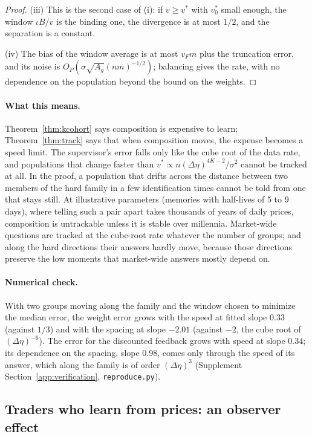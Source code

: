 \documentclass[12pt]{article}
\theoremstyle{definition}
\theoremstyle{remark}
\begin{document}
\begin{proof}
(iii) This is the second case of (i): if $v\ge v^*$ with $v^*_0$ small enough, the window $\iota B/v$ is the binding one, the divergence is at most $1/2$, and the separation is a constant.

(iv) The bias of the window average is at most $v_Fm$ plus the truncation error, and its noise is $O_P(\sigma\sqrt{A_g}(nm)^{-1/2})$; balancing gives the rate, with no dependence on the population beyond the bound on the weights.
\end{proof}

\paragraph{What this means.} Theorem~\ref{thm:kcohort} says composition is expensive to learn; Theorem~\ref{thm:track} says that when composition moves, the expense becomes a speed limit. The supervisor's error falls only like the cube root of the data rate, and populations that change faster than $v^*\propto n(\Delta\eta)^{4K-2}/\sigma^2$ cannot be tracked at all. In the proof, a population that drifts across the distance between two members of the hard family in a few identification times cannot be told from one that stays still. At illustrative parameters (memories with half-lives of 5 to 9 days), where telling such a pair apart takes thousands of years of daily prices, composition is untrackable unless it is stable over millennia. Market-wide questions are tracked at the cube-root rate whatever the number of groups; and along the hard directions their answers hardly move, because those directions preserve the low moments that market-wide answers mostly depend on.

\paragraph{Numerical check.} With two groups moving along the family and the window chosen to minimize the median error, the weight error grows with the speed at fitted slope $0.33$ (against $1/3$) and with the spacing at slope $-2.01$ (against $-2$, the cube root of $(\Delta\eta)^{-6}$). The error for the discounted feedback grows with speed at slope $0.34$; its dependence on the spacing, slope $0.98$, comes only through the speed of its answer, which along the family is of order $(\Delta\eta)^3$ (Supplement Section~\ref{app:verification}, \nolinkurl{reproduce.py}).

\subsection{Traders who learn from prices: an observer effect}
\end{document}
